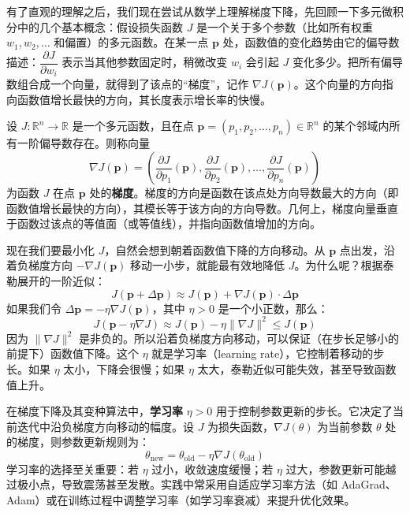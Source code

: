 \documentclass[lang=cn,zihao=-4,a4paper,fontset=windows]{beautybook}
\renewcommand{\partial}{∂}
\begin{document}
有了直观的理解之后，我们现在尝试从数学上理解梯度下降，先回顾一下多元微积分中的几个基本概念：假设损失函数 $J$ 是一个关于多个参数（比如所有权重 $w_1, w_2, \dots$ 和偏置）的多元函数。在某一点 $\mathbf{p}$ 处，函数值的变化趋势由它的偏导数描述：$\dfrac{\partial J}{\partial w_i}$ 表示当其他参数固定时，稍微改变 $w_i$ 会引起 $J$ 变化多少。把所有偏导数组合成一个向量，就得到了该点的“梯度”，记作 $\nabla J(\mathbf{p})$。这个向量的方向指向函数值增长最快的方向，其长度表示增长率的快慢。

\begin{definition}[][梯度]
设 $J: \mathbb{R}^n \to \mathbb{R}$ 是一个多元函数，且在点 $\mathbf{p} = (p_1, p_2, \dots, p_n) \in \mathbb{R}^n$ 的某个邻域内所有一阶偏导数存在。则称向量
\[\nabla J(\mathbf{p}) = \left( \frac{\partial J}{\partial p_1}(\mathbf{p}), \frac{\partial J}{\partial p_2}(\mathbf{p}), \dots, \frac{\partial J}{\partial p_n}(\mathbf{p}) \right)\]
为函数 $J$ 在点 $\mathbf{p}$ 处的\textbf{梯度}。梯度的方向是函数在该点处方向导数最大的方向（即函数值增长最快的方向），其模长等于该方向的方向导数。几何上，梯度向量垂直于函数过该点的等值面（或等值线），并指向函数值增加的方向。
\end{definition}

现在我们要最小化 $J$，自然会想到朝着函数值下降的方向移动。从 $\mathbf{p}$ 点出发，沿着负梯度方向 $-\nabla J(\mathbf{p})$ 移动一小步，就能最有效地降低 $J$。为什么呢？根据泰勒展开的一阶近似：
\[J(\mathbf{p} + \Delta \mathbf{p}) \approx J(\mathbf{p}) + \nabla J(\mathbf{p}) \cdot \Delta \mathbf{p}\]
如果我们令 $\Delta \mathbf{p} = -\eta \nabla J(\mathbf{p})$，其中 $\eta > 0$ 是一个小正数，那么：
\[J(\mathbf{p} - \eta \nabla J) \approx J(\mathbf{p}) - \eta \|\nabla J\|^2 \leqslant J(\mathbf{p})\]
因为 $\|\nabla J\|^2$ 是非负的。所以沿着负梯度方向移动，可以保证（在步长足够小的前提下）函数值下降。这个 $\eta$ 就是学习率（learning rate），它控制着移动的步长。如果 $\eta$ 太小，下降会很慢；如果 $\eta$ 太大，泰勒近似可能失效，甚至导致函数值上升。

\begin{definition}
在梯度下降及其变种算法中，\textbf{学习率} $\eta > 0$ 用于控制参数更新的步长。它决定了当前迭代中沿负梯度方向移动的幅度。设 $J$ 为损失函数，$\nabla J(\theta)$ 为当前参数 $\theta$ 处的梯度，则参数更新规则为：
\[\theta_{\text{new}} = \theta_{\text{old}} - \eta \nabla J(\theta_{\text{old}})\]
学习率的选择至关重要：若 $\eta$ 过小，收敛速度缓慢；若 $\eta$ 过大，参数更新可能越过极小点，导致震荡甚至发散。实践中常采用自适应学习率方法（如 AdaGrad、Adam）或在训练过程中调整学习率（如学习率衰减）来提升优化效果。
\end{definition}
\end{document}
